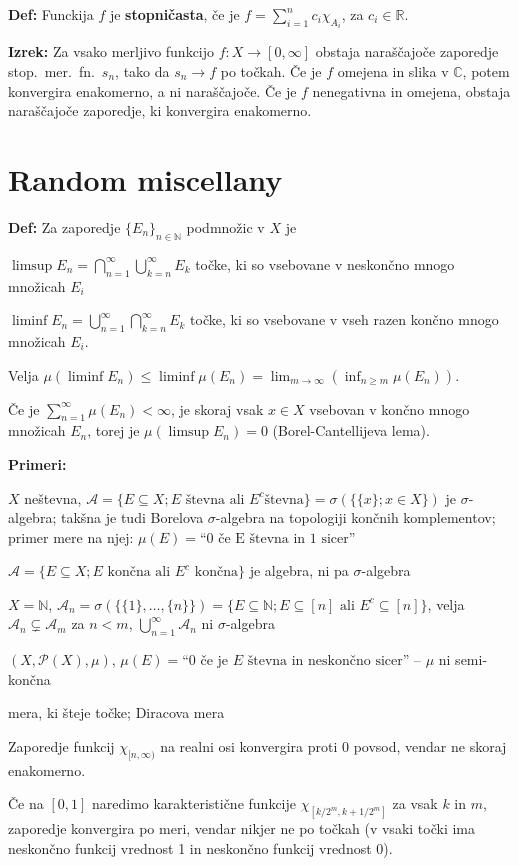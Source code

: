 \documentclass[a4paper,oneside,10pt]{article}
\theoremstyle{definition}
\newcommand{\R}{\ensuremath{\mathbb{R}}}
\newcommand{\N}{\ensuremath{\mathbb{N}}}
\renewcommand{\C}{\ensuremath{\mathbb{C}}}
\newenvironment{itemize*}{\vspace{-10pt}\begin{itemize}\setlength{\itemsep}{0pt}\setlength{\parskip}{2pt}}{\end{itemize}}
\newcommand{\A}{\ensuremath{\mathcal{A}}}
\begin{document}
\textbf{Def:} Funckija $f$ je \textbf{stopničasta}, če je $f = \sum_{i=1}^n c_i
\chi_{A_i}$, za $c_i \in \R$.

\textbf{Izrek:} Za vsako merljivo funkcijo $f\colon X \to [0, \infty]$ obstaja
naraščajoče zaporedje stop.~mer.~fn.~$s_n$, tako da $s_n \to f$ po točkah. Če je
$f$ omejena in slika v $\C$, potem konvergira enakomerno, a ni naraščajoče.  Če
je $f$ nenegativna in omejena, obstaja naraščajoče zaporedje, ki konvergira
enakomerno.

\section*{Random miscellany}

\textbf{Def:} Za zaporedje $\{E_n\}_{n\in\mathbb N}$ podmnožic v $X$ je
\begin{itemize*}
  \item $\limsup E_n = \bigcap_{n = 1}^\infty \bigcup_{k = n}^\infty E_k$
    točke, ki so vsebovane v neskončno mnogo množicah $E_i$
  \item $\liminf E_n = \bigcup_{n = 1}^\infty \bigcap_{k = n}^\infty E_k$
    točke, ki so vsebovane v vseh razen končno mnogo množicah $E_i$.
  \item Velja $\mu(\liminf E_n) \leq \liminf \mu(E_n) = \lim_{m\to \infty}
    (\inf_{n \geq m} \mu(E_n)).$
  \item Če je $\sum_{n = 1}^\infty \mu(E_n) < \infty$, je skoraj vsak $x \in X$
    vsebovan v končno mnogo množicah $E_n$, torej je $\mu(\limsup E_n)=0$
    (Borel-Cantellijeva lema).
\end{itemize*}

\textbf{Primeri:}
\begin{itemize*}
  \item $X$ neštevna, $\A = \{E \subseteq X; E \text{ števna ali } E^c \text{
    števna}\} = \sigma (\{\{x\}; x \in X\})$ je $\sigma$-algebra; takšna je tudi
    Borelova $\sigma$-algebra na topologiji končnih komplementov; primer mere na
    njej: $\mu(E) = \text{``0 če E števna in 1 sicer''}$
  \item$\A = \{E \subseteq X; E \text{ končna ali } E^c \text{ končna}\}$ je
    algebra, ni pa $\sigma$-algebra
  \item $X = \N$, $\A_n = \sigma(\{\{1\}, \ldots, \{n\}\}) = \{E \subseteq \N; E
      \subseteq [n] \text{ ali } E^c \subseteq [n]\}$, velja $\A_n \subsetneq
      \A_m$ za $n<m$, $\bigcup_{n = 1}^\infty \A_n$ ni $\sigma$-algebra
  \item $(X, \mathcal{P}(X), \mu)$, $\mu(E) = \text{``0 če je $E$ števna in neskončno sicer''}$
    -- $\mu$ ni semi-končna
  \item mera, ki šteje točke; Diracova mera
  \item Zaporedje funkcij $\chi_{[n, \infty)}$ na realni osi konvergira proti $0$
      povsod, vendar ne skoraj enakomerno.
  \item Če na $[0,1]$ naredimo karakteristične funkcije $\chi_{[k/2^m, k+1/2^m]}$
    za vsak $k$ in $m$, zaporedje konvergira po meri, vendar nikjer ne po točkah
    (v vsaki točki ima neskončno funkcij vrednost 1 in neskončno funkcij vrednost 0).
\end{itemize*}
\end{document}
